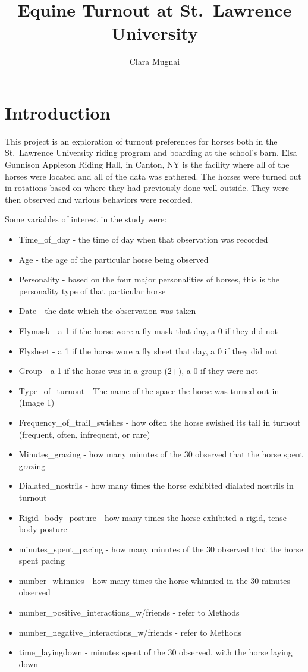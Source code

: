 \documentclass[
]{article}
\title{Equine Turnout at St.~Lawrence University}
\subtitle{Clara Mugnai}
\author{}
\date{\vspace{-2.5em}}
\providecommand{\tightlist}{%
  \setlength{\itemsep}{0pt}\setlength{\parskip}{0pt}}
\begin{document}
\maketitle

\hypertarget{introduction}{%
\section{Introduction}\label{introduction}}

This project is an exploration of turnout preferences for horses both in
the St.~Lawrence University riding program and boarding at the school's
barn. Elsa Gunnison Appleton Riding Hall, in Canton, NY is the facility
where all of the horses were located and all of the data was gathered.
The horses were turned out in rotations based on where they had
previously done well outside. They were then observed and various
behaviors were recorded.

Some variables of interest in the study were:

\begin{itemize}
\tightlist
\item
  Time\_of\_day - the time of day when that observation was recorded
\item
  Age - the age of the particular horse being observed
\item
  Personality - based on the four major personalities of horses, this is
  the personality type of that particular horse
\item
  Date - the date which the observation was taken
\item
  Flymask - a 1 if the horse wore a fly mask that day, a 0 if they did
  not
\item
  Flysheet - a 1 if the horse wore a fly sheet that day, a 0 if they did
  not
\item
  Group - a 1 if the horse was in a group (2+), a 0 if they were not
\item
  Type\_of\_turnout - The name of the space the horse was turned out in
  (Image 1)
\item
  Frequency\_of\_trail\_swishes - how often the horse swished its tail
  in turnout (frequent, often, infrequent, or rare)
\item
  Minutes\_grazing - how many minutes of the 30 observed that the horse
  spent grazing
\item
  Dialated\_nostrils - how many times the horse exhibited dialated
  nostrils in turnout
\item
  Rigid\_body\_posture - how many times the horse exhibited a rigid,
  tense body posture
\item
  minutes\_spent\_pacing - how many minutes of the 30 observed that the
  horse spent pacing
\item
  number\_whinnies - how many times the horse whinnied in the 30 minutes
  observed
\item
  number\_positive\_interactions\_w/friends - refer to Methods
\item
  number\_negative\_interactions\_w/friends - refer to Methods
\item
  time\_layingdown - minutes spent of the 30 observed, with the horse
  laying down
\end{itemize}
\end{document}
